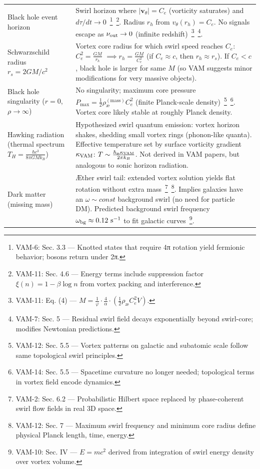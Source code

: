 \documentclass[a4paper,12pt]{article}
\begin{document}
\begin{table}[H]
\begin{tabular}{p{} | p{}}
            Black hole event horizon & Swirl horizon where $|\mathbf{v}_\theta| = C_e$ (vorticity saturates) and $d\tau/dt \to 0$~\footnote{VAM-6: Sec. 3.3 — Knotted states that require 4π rotation yield fermionic behavior; bosons return under 2π.}~\footnote{VAM-11: Sec. 4.6 — Energy terms include suppression factor $\xi(n) = 1 - \beta \log n$ from vortex packing and interference.}. Radius $r_h$ from $v_\theta(r_h)=C_e$. No signals escape as $\nu_{\rm out}\to 0$ (infinite redshift)~\footnote{VAM-11: Eq. (4) — $M = \frac{1}{\varphi} \cdot \frac{4}{\alpha} \cdot \left( \frac{1}{2} \rho_{\text{\ae}} C_e^2 V \right)$.}~\footnote{VAM-7: Sec. 5 — Residual swirl field decays exponentially beyond swirl-core; modifies Newtonian predictions.}. \\
            Schwarzschild radius $r_s = 2GM/c^2$ & Vortex core radius for which swirl speed reaches $C_e$: $C_e^2 = \frac{GM}{r_h}$ $\implies r_h = \frac{GM}{C_e^2}$ (if $C_e \approx c$, then $r_h \approx r_s$). If $C_e < c$, black hole is larger for same $M$ (so VAM suggests minor modifications for very massive objects). \\
            Black hole singularity ($r=0$, $\rho\to\infty$) & No singularity; maximum core pressure $P_{\max} = \frac{1}{2}\rho_{\text{\ae}}^{(\text{mass})}C_e^2$ (finite Planck-scale density)~\footnote{VAM-12: Sec. 5.5 — Vortex patterns on galactic and subatomic scale follow same topological swirl principles.}~\footnote{VAM-14: Sec. 5.5 — Spacetime curvature no longer needed; topological terms in vortex field encode dynamics.}. Vortex core likely stable at roughly Planck density. \\
            Hawking radiation (thermal spectrum $T_H = \frac{\hbar c^3}{8\pi GMk_B}$) & Hypothesized swirl quantum emission: vortex horizon shakes, shedding small vortex rings (phonon-like quanta). Effective temperature set by surface vorticity gradient $\kappa_{\rm VAM}$: $T \sim \frac{\hbar_{\text{\ae}}\kappa_{\rm VAM}}{2\pi k_B}$. Not derived in VAM papers, but analogous to sonic horizon radiation. \\
            Dark matter (missing mass) & Æther swirl tail: extended vortex solution yields flat rotation without extra mass~\footnote{VAM-2: Sec. 6.2 — Probabilistic Hilbert space replaced by phase-coherent swirl flow fields in real 3D space.}~\footnote{VAM-12: Sec. 7 — Maximum swirl frequency and minimum core radius define physical Planck length, time, energy.}. Implies galaxies have an $\omega \sim const$ background swirl (no need for particle DM). Predicted background swirl frequency $\omega_{\rm bg}\approx 0.12~\text{s}^{-1}$ to fit galactic curves~\footnote{VAM-10: Sec. IV — $E = mc^2$ derived from integration of swirl energy density over vortex volume.}. \\

\end{tabular}
\end{table}
\end{document}
